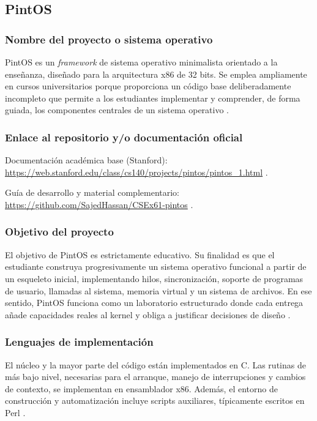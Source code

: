 \subsection{PintOS}

\subsubsection{Nombre del proyecto o sistema operativo}
PintOS es un \textit{framework} de sistema operativo minimalista orientado a la enseñanza, diseñado para la arquitectura x86 de 32 bits. Se emplea ampliamente en cursos universitarios porque proporciona un código base deliberadamente incompleto que permite a los estudiantes implementar y comprender, de forma guiada, los componentes centrales de un sistema operativo \cite{pintos_stanford}.

\subsubsection{Enlace al repositorio y/o documentación oficial}
Documentación académica base (Stanford): \url{https://web.stanford.edu/class/cs140/projects/pintos/pintos_1.html} \cite{pintos_stanford}.

Guía de desarrollo y material complementario: \url{https://github.com/SajedHassan/CSEx61-pintos} \cite{pintos_purpose}.

\subsubsection{Objetivo del proyecto}
El objetivo de PintOS es estrictamente educativo. Su finalidad es que el estudiante construya progresivamente un sistema operativo funcional a partir de un esqueleto inicial, implementando hilos, sincronización, soporte de programas de usuario, llamadas al sistema, memoria virtual y un sistema de archivos. En ese sentido, PintOS funciona como un laboratorio estructurado donde cada entrega añade capacidades reales al kernel y obliga a justificar decisiones de diseño \cite{pintos_purpose, pintos_stanford}.

\subsubsection{Lenguajes de implementación}
El núcleo y la mayor parte del código están implementados en C. Las rutinas de más bajo nivel, necesarias para el arranque, manejo de interrupciones y cambios de contexto, se implementan en ensamblador x86. Además, el entorno de construcción y automatización incluye scripts auxiliares, típicamente escritos en Perl \cite{pintos_stanford}.

